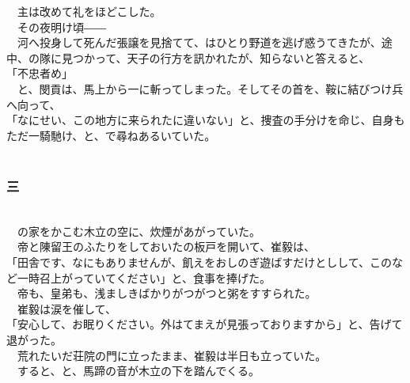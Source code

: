 \documentclass[
  paper=a5,
  fontsize=10pt,
  jafontsize=9.5pt,
  tate,                  %
  open_bracket_pos=nibu, %
]{jlreq}
\begin{document}
　主は改めて礼をほどこした。\\


　その夜明け頃――\\


　河へ投身して死んだ張譲を見捨てて、はひとり野道を逃げ惑うてきたが、途中、の隊に見つかって、天子の行方を訊かれたが、知らないと答えると、\\


「不忠者め」\\


　と、閔貢は、馬上から一に斬ってしまった。そしてその首を、鞍に結びつけ兵へ向って、\\


「なにせい、この地方に来られたに違いない」と、捜査の手分けを命じ、自身もただ一騎馳け、と、で尋ねあるいていた。\\

\\

\subsubsection{三}

\\


　の家をかこむ木立の空に、炊煙があがっていた。\\


　帝と陳留王のふたりをしておいたの板戸を開いて、崔毅は、\\


「田舎です、なにもありませんが、飢えをおしのぎ遊ばすだけとしして、このなど一時召上がっていてください」と、食事を捧げた。\\


　帝も、皇弟も、浅ましきばかりがつがつと粥をすすられた。\\


　崔毅は涙を催して、\\


「安心して、お眠りください。外はてまえが見張っておりますから」と、告げて退がった。\\


　荒れたいだ荘院の門に立ったまま、崔毅は半日も立っていた。\\


　すると、と、馬蹄の音が木立の下を踏んでくる。\\
\end{document}
